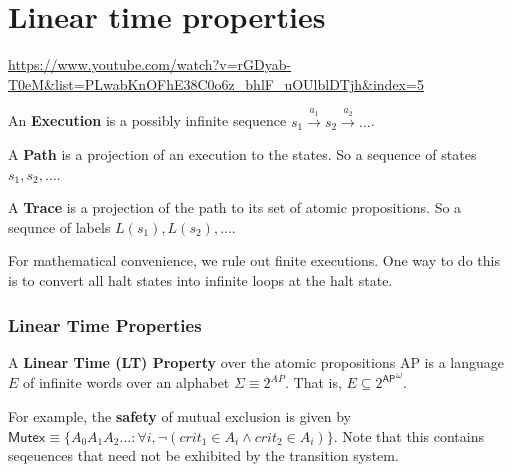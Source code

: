 \chapter{Linear time properties}
\newcommand{\E}{\ensuremath{\mathsf E}}
\newcommand{\T}{\mathcal T}
\newcommand{\tone}{\ensuremath{\T_1}}
\newcommand{\ttwo}{\ensuremath{\T_2}}
\newcommand{\traces}{\mathsf{Traces}}
\newcommand{\Traces}{\traces}
\newcommand{\AP}{\mathsf{AP}}
\newcommand{\MUTEX}{\mathsf{Mutex}}
\newcommand{\mutex}{\MUTEX}
\newcommand{\powerset}[1]{\ensuremath{2^{#1}}}

\url{https://www.youtube.com/watch?v=rGDyab-T0eM&list=PLwabKnOFhE38C0o6z_bhlF_uOUlblDTjh&index=5}

\begin{definition}
An \textbf{Execution} is a possibly infinite sequence $s_1 \xrightarrow{a_1} s_2 \xrightarrow{a_2} \dots$.
\end{definition}

\begin{definition}
A \textbf{Path} is a projection of an execution to the states. So a sequence of states $s_1, s_2, \dots$.
\end{definition}

\begin{definition}
A \textbf{Trace} is a projection of the path to its set of atomic propositions. So a sequnce of labels $L(s_1), L(s_2), \dots$.
\end{definition}

For mathematical convenience, we rule out finite executions. One way to do this is 
to convert all halt states into infinite loops at the halt state.

\subsection{Linear Time Properties}

\begin{definition}
A \textbf{Linear Time (LT) Property} over the atomic propositions AP is a language $E$ of infinite words over an alphabet $\Sigma \equiv 2^{AP}$.
That is, $E \subseteq {\powerset{\AP}}^\omega$.
\end{definition}

For example, the \textbf{safety} of mutual exclusion is given by $\MUTEX \equiv \{ A_0A_1A_2\dots : \forall i, \lnot (crit_1 \in A_i \land crit_2 \in A_i) \}$.
Note that this contains seqeuences that need not be exhibited by the transition system.

